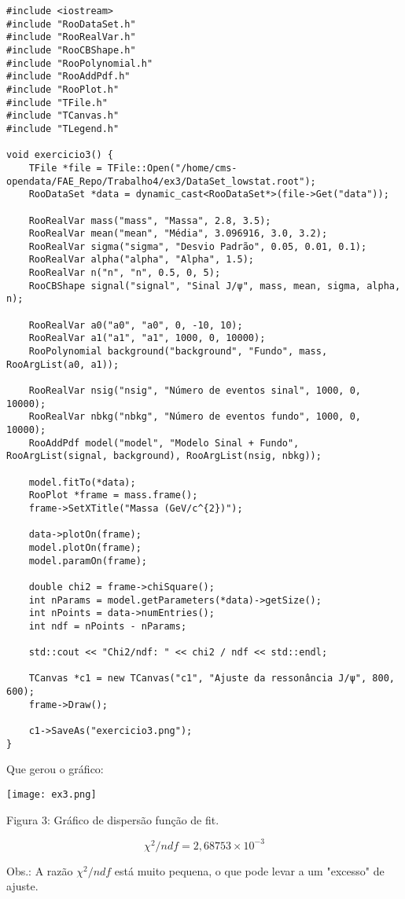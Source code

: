 \documentclass[a4 paper]{article}
\numberwithin{equation}{section}
\newcommand{\0}{\mathbf{0}}
\begin{document}
\begin{lstlisting}
#include <iostream>
#include "RooDataSet.h"
#include "RooRealVar.h"
#include "RooCBShape.h"
#include "RooPolynomial.h"
#include "RooAddPdf.h"
#include "RooPlot.h"
#include "TFile.h"
#include "TCanvas.h"
#include "TLegend.h"

void exercicio3() {
	TFile *file = TFile::Open("/home/cms-opendata/FAE_Repo/Trabalho4/ex3/DataSet_lowstat.root");
	RooDataSet *data = dynamic_cast<RooDataSet*>(file->Get("data"));

	RooRealVar mass("mass", "Massa", 2.8, 3.5);
	RooRealVar mean("mean", "Média", 3.096916, 3.0, 3.2);
	RooRealVar sigma("sigma", "Desvio Padrão", 0.05, 0.01, 0.1);
	RooRealVar alpha("alpha", "Alpha", 1.5);
	RooRealVar n("n", "n", 0.5, 0, 5);
	RooCBShape signal("signal", "Sinal J/ψ", mass, mean, sigma, alpha, n);
    
	RooRealVar a0("a0", "a0", 0, -10, 10);
	RooRealVar a1("a1", "a1", 1000, 0, 10000);
	RooPolynomial background("background", "Fundo", mass, RooArgList(a0, a1));
    
	RooRealVar nsig("nsig", "Número de eventos sinal", 1000, 0, 10000);
	RooRealVar nbkg("nbkg", "Número de eventos fundo", 1000, 0, 10000);
	RooAddPdf model("model", "Modelo Sinal + Fundo", RooArgList(signal, background), RooArgList(nsig, nbkg));
    
	model.fitTo(*data);
	RooPlot *frame = mass.frame();
	frame->SetXTitle("Massa (GeV/c^{2})");

	data->plotOn(frame);
	model.plotOn(frame);
	model.paramOn(frame);

	double chi2 = frame->chiSquare();
	int nParams = model.getParameters(*data)->getSize();
	int nPoints = data->numEntries();
	int ndf = nPoints - nParams;

	std::cout << "Chi2/ndf: " << chi2 / ndf << std::endl;

	TCanvas *c1 = new TCanvas("c1", "Ajuste da ressonância J/ψ", 800, 600);
	frame->Draw();

	c1->SaveAs("exercicio3.png");
}
\end{lstlisting}
Que gerou o gráfico:

\texttt{[image: ex3.png]}
\begin{center}
    Figura 3: Gráfico de dispersão função de fit.
\end{center}

\large $$\chi^{2}/ndf=2,68753\times 10^{-3}$$ \normalsize

Obs.: A razão $\chi^{2}/ndf$ está muito pequena, o que pode levar a um "excesso" de ajuste.
\end{document}
